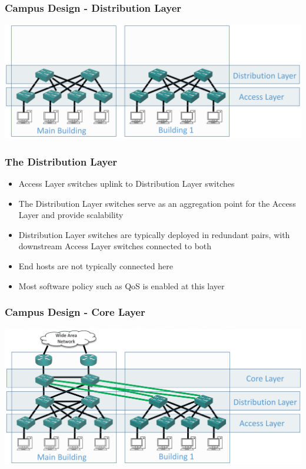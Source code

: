 \documentclass[pdflatex,compress,mathserif]{beamer}
\begin{document}
\begin{frame}
	\frametitle{Campus Design - Distribution Layer}
	\begin{center}
		\includegraphics[width=\linewidth]{img/img02}
	\end{center}
\end{frame}

\begin{frame}
	\frametitle{The Distribution Layer}
	\begin{itemize}
		\item Access Layer switches uplink to Distribution Layer switches
		\item The Distribution Layer switches serve as an aggregation point for the
Access Layer and provide scalability
		\item Distribution Layer switches are typically deployed in redundant pairs,
with downstream Access Layer switches connected to both
		\item End hosts are not typically connected here
		\item Most software policy such as QoS is enabled at this layer
	\end{itemize}
\end{frame}

\begin{frame}
	\frametitle{Campus Design - Core Layer}
	\begin{center}
		\includegraphics[width=\linewidth]{img/img03}
	\end{center}
\end{frame}
\end{document}
